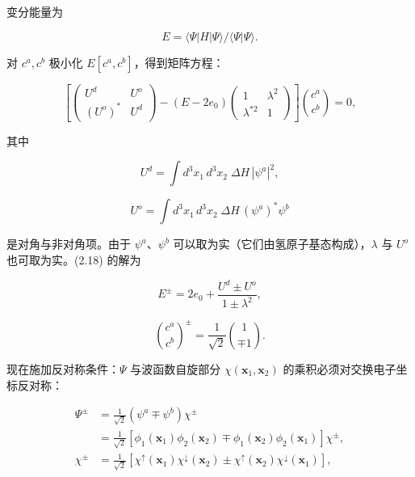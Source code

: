 变分能量为

\begin{equation*}
E = \langle \Psi | H | \Psi \rangle / \langle \Psi | \Psi \rangle.
\tag{2.17}
\end{equation*}

对 $c^a, c^b$ 极小化 $E[c^a, c^b]$，得到矩阵方程：

\begin{equation*}
\left[ \left( \begin{array}{cc} U ^ {d} & U ^ {o} \\ (U ^ {o}) ^ {*} & U ^ {d} \end{array} \right) - (E - 2 e _ {0}) \left( \begin{array}{cc} 1 & \lambda^ {2} \\ \lambda^ {*2} & 1 \end{array} \right) \right] \binom{c ^ {a}}{c ^ {b}} = 0,
\tag{2.18}
\end{equation*}

其中

\begin{equation*}
U ^ {d} = \int d ^ {3} x _ {1} \, d ^ {3} x _ {2} \; \Delta H \, | \psi^ {a} | ^ {2},
\tag{2.19}
\end{equation*}

\begin{equation*}
U ^ {o} = \int d ^ {3} x _ {1} \, d ^ {3} x _ {2} \; \Delta H \, (\psi^ {a}) ^ {*} \psi^ {b}
\tag{2.20}
\end{equation*}

是对角与非对角项。由于 $\psi^{a}$、$\psi^{b}$ 可以取为实（它们由氢原子基态构成），$\lambda$ 与 $U^{o}$ 也可取为实。(2.18) 的解为

\begin{equation*}
E ^ {\pm} = 2 e _ {0} + \frac {U ^ {d} \pm U ^ {o}}{1 \pm \lambda^ {2}},
\tag{2.21}
\end{equation*}

\begin{equation*}
\binom{c ^ {a}}{c ^ {b}} ^ {\pm} = \frac {1}{\sqrt {2}} \binom{1}{\mp 1}.
\tag{2.22}
\end{equation*}

现在施加反对称条件：$\Psi$ 与波函数自旋部分 $\chi(\mathbf{x}_{1},\mathbf{x}_{2})$ 的乘积必须对交换电子坐标反对称：

\begin{align*}
\Psi^ {\pm} & = \frac {1}{\sqrt {2}} \left( \psi^ {a} \mp \psi^ {b} \right) \chi^ {\pm}\\
& = \frac {1}{\sqrt {2}} \left[ \phi_ {1} (\mathbf {x} _ {1}) \phi_ {2} (\mathbf {x} _ {2}) \mp \phi_ {1} (\mathbf {x} _ {2}) \phi_ {2} (\mathbf {x} _ {1}) \right] \chi^ {\pm},\\
\chi^ {\pm} & = \frac {1}{\sqrt {2}} \left[ \chi^ {\uparrow} (\mathbf {x} _ {1}) \chi^ {\downarrow} (\mathbf {x} _ {2}) \pm \chi^ {\uparrow} (\mathbf {x} _ {2}) \chi^ {\downarrow} (\mathbf {x} _ {1}) \right],
\tag{2.23}
\end{align*}

